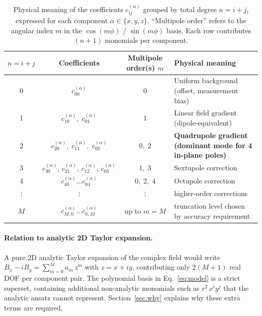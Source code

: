 \documentclass[11pt]{article}
\begin{document}
\begin{table}[htbp]
\centering
\caption{Physical meaning of the coefficients
         $c^{(\alpha)}_{ij}$ grouped by total degree
         $n = i + j$, expressed for each component
         $\alpha \in \{x, y, z\}$. ``Multipole order'' refers to the
         angular index $m$ in the $\cos(m\phi)$ / $\sin(m\phi)$
         basis. Each row contributes $(n + 1)$ monomials per component.}
\label{tab:interp}
\begin{tabular}{c c c l}
\toprule
$n = i+j$ & Coefficients & Multipole order(s) $m$ & Physical meaning \\
\midrule
0 & $c^{(\alpha)}_{00}$
  & $0$
  & Uniform background (offset, measurement bias) \\
1 & $c^{(\alpha)}_{10},\; c^{(\alpha)}_{01}$
  & $1$
  & Linear field gradient (dipole-equivalent) \\
2 & $c^{(\alpha)}_{20},\; c^{(\alpha)}_{11},\; c^{(\alpha)}_{02}$
  & $0,\; 2$
  & \cellcolor{yellow!25}\textbf{Quadrupole gradient (dominant mode for 4 in-plane poles)} \\
3 & $c^{(\alpha)}_{30},\, c^{(\alpha)}_{21},\, c^{(\alpha)}_{12},\, c^{(\alpha)}_{03}$
  & $1,\; 3$
  & Sextupole correction \\
4 & $c^{(\alpha)}_{40} \dots c^{(\alpha)}_{04}$
  & $0,\; 2,\; 4$
  & Octupole correction \\
$\vdots$ & $\vdots$ & $\vdots$ & higher-order corrections \\
$M$ & $c^{(\alpha)}_{M,0} \dots c^{(\alpha)}_{0,M}$
    & up to $m = M$
    & truncation level chosen by accuracy requirement \\
\bottomrule
\end{tabular}
\end{table}

\paragraph{Relation to analytic 2D Taylor expansion.}
A pure 2D analytic Taylor expansion of the complex field would write
$B_x - i B_y = \sum_{m=0}^{M} a_m\, z^{m}$
with $z = x + i y$, contributing only $2(M+1)$ real DOF per component
pair. The polynomial basis in Eq.~\eqref{eq:model} is a
strict superset, containing additional non-analytic monomials such
as $r^{2}\, x^{i} y^{j}$ that the analytic ansatz cannot represent.
Section~\ref{sec:why} explains why these extra terms are required.

\end{document}
